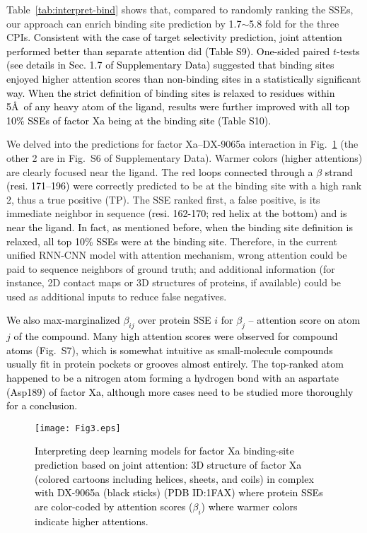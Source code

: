 \documentclass[nocrop]{bioinfo}
\newcommand{\red}[1]{\textcolor{black}{#1}}
\begin{document}
Table~\ref{tab:interpret-bind} shows that, compared to randomly ranking the SSEs, our approach can enrich binding site prediction by \red{1.7}$\sim$\red{5.8} fold for the three CPIs. \red{Consistent with the case of target selectivity prediction, joint attention performed better than separate attention did (Table S9). One-sided paired $t$-tests (see details in Sec. 1.7 of Supplementary Data) suggested that binding sites enjoyed higher attention scores than non-binding sites in a statistically significant way. When the strict definition of binding sites is relaxed to residues within 5\AA\ of any heavy atom of the ligand, results were further improved with all top 10\% SSEs of factor Xa being at the binding site (Table S10).}


We delved into the predictions for factor Xa--DX-9065a interaction in Fig.~\ref{fig:1fax}  (the other 2 are in Fig.~S6 of Supplementary Data). Warmer colors (higher attentions) are clearly focused near the ligand. The red \red{loops connected through a $\beta$ strand (resi. 171--196) were} correctly predicted to be at the binding site with a high rank 2, thus a true positive  (TP).  The SSE ranked first, a false positive, is its immediate neighbor in sequence \red{(resi. 162-170; red helix at the bottom) and is near the ligand. In fact, as mentioned before, when the binding site definition is relaxed, all top 10\% SSEs were at the binding site.  } Therefore, in the current unified RNN-CNN model with attention mechanism, wrong attention could be paid to sequence neighbors of ground truth; and additional information  (for instance, 2D contact maps or 3D structures of proteins, if available) could be used as additional inputs to reduce false negatives. 

\red{We also max-marginalized $\beta_{ij}$ over protein SSE $i$ for $\beta_j$ -- attention score on atom $j$ of the compound. Many high attention scores were observed for compound atoms (Fig.~S7), which is somewhat intuitive as small-molecule compounds usually fit in protein pockets or grooves almost entirely. The top-ranked atom happened to be a nitrogen atom forming a hydrogen bond with an aspartate (Asp189) of factor Xa, although more cases need to be studied more thoroughly for a conclusion.}  


\begin{figure}[!htb]
    \vspace{-2em}
    \centering
    \texttt{[image: Fig3.eps]}
        \vspace{-2em}
    \caption{\red{Interpreting deep learning models for factor Xa binding-site prediction based on joint attention: 3D structure of factor Xa  (colored cartoons including helices, sheets, and coils) in complex with DX-9065a  (black sticks)  (PDB ID:1FAX) where protein SSEs are color-coded by attention scores  ($\beta_i$) where warmer colors indicate higher attentions.}}
    \label{fig:1fax}
    \vspace{-2em}
\end{figure}
\end{document}
